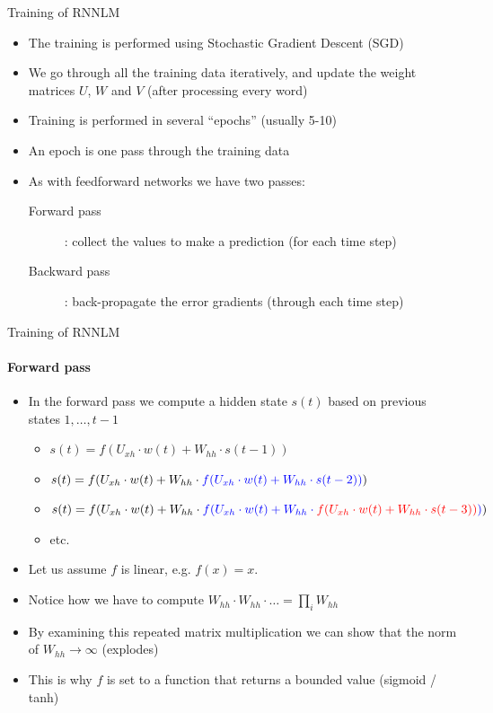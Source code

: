 \begin{frame}{Training of RNNLM}
\begin{itemize}[<+->]
	\item The training is performed using Stochastic Gradient Descent (SGD)
	\item We go through all the training data iteratively, and update the weight matrices $U$, $W$ and $V$ (after processing every word)
	\item Training is performed in several ``epochs'' (usually 5-10)
	\item An epoch is one pass through the training data
	\item As with feedforward networks we have two passes:
	\begin{description}
		\item[Forward pass]: collect the values to make a prediction (for each time step)
		\item[Backward pass]: back-propagate the error gradients (through each time step)
	\end{description}
\end{itemize}
\end{frame}

\begin{frame}{Training of RNNLM}
\framesubtitle{Forward pass}
\begin{itemize}[<+->]
	\item In the forward pass we compute a hidden state $s(t)$ based on previous states $1, \ldots, t-1$
	\begin{itemize}
	\item $s(t) = f(U_{xh} \cdot w(t) + W_{hh} \cdot s(t-1))$
	\item $s(t) = f(U_{xh} \cdot w(t) + W_{hh} \cdot \textcolor{blue}{f(U_{xh} \cdot w(t) + W_{hh} \cdot s(t-2))})$
	\item $s(t) = f(U_{xh} \cdot w(t) + W_{hh} \cdot \textcolor{blue}{f(U_{xh} \cdot w(t) + W_{hh} \cdot \textcolor{red}{f(U_{xh} \cdot w(t) + W_{hh} \cdot s(t-3))})})$
	\item etc.\ 
	\end{itemize}
	\item Let us assume $f$ is linear, e.g. $f(x) = x$. 
	\item Notice how we have to compute $W_{hh} \cdot W_{hh}  \cdot \ldots = \prod_i W_{hh}$
	\item By examining this repeated matrix multiplication we can show that the norm of $W_{hh} \rightarrow \infty$ (explodes)
	\item This is why $f$ is set to a function that returns a bounded value (sigmoid / tanh)
\end{itemize}
\end{frame}

